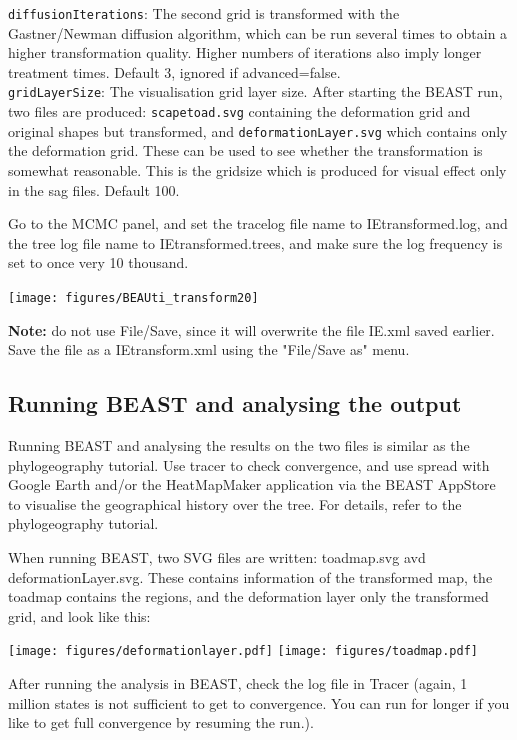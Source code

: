 \documentclass{article}
\begin{document}
{\tt diffusionIterations}: The second grid is transformed with the Gastner/Newman diffusion 
algorithm, which can be run several times to obtain a higher transformation quality. 
Higher numbers of iterations also imply longer treatment times.
Default 3, ignored if advanced=false.\\

{\tt gridLayerSize}: The visualisation grid layer size. After starting the BEAST run, two files are produced:
{\tt scapetoad.svg} containing the deformation grid and original shapes but transformed, and 
{\tt deformationLayer.svg} which contains only the deformation grid. These can be used to see whether the transformation is somewhat reasonable. This is the gridsize which is produced for visual effect only in the sag files. 
Default 100.


Go to the MCMC panel, and set the tracelog file name to IEtransformed.log, and the tree log file name to IEtransformed.trees, and make sure the log frequency is set to once very 10 thousand.
\begin{center}
\texttt{[image: figures/BEAUti\_transform20]}
\end{center}

{\bf Note:} do not use File/Save, since it will overwrite the file IE.xml saved earlier. Save the file as a IEtransform.xml using the "File/Save as" menu.

\subsection*{Running BEAST and analysing the output}

Running BEAST and analysing the results on the two files is similar as the phylogeography tutorial. Use tracer to check convergence, and use spread with Google Earth and/or the HeatMapMaker application via the BEAST AppStore to visualise the geographical history over the tree. For details, refer to the phylogeography tutorial.

When running BEAST, two SVG files are written: toadmap.svg avd deformationLayer.svg. These contains information of the transformed map, the toadmap contains the regions, and the deformation layer only the transformed grid, and look like this:

\texttt{[image: figures/deformationlayer.pdf]}
\texttt{[image: figures/toadmap.pdf]}

After running the analysis in BEAST, check the log file in Tracer (again, 1 million states is not sufficient to get to convergence. You can run for longer if you like to get full convergence by resuming the run.).
\end{document}
